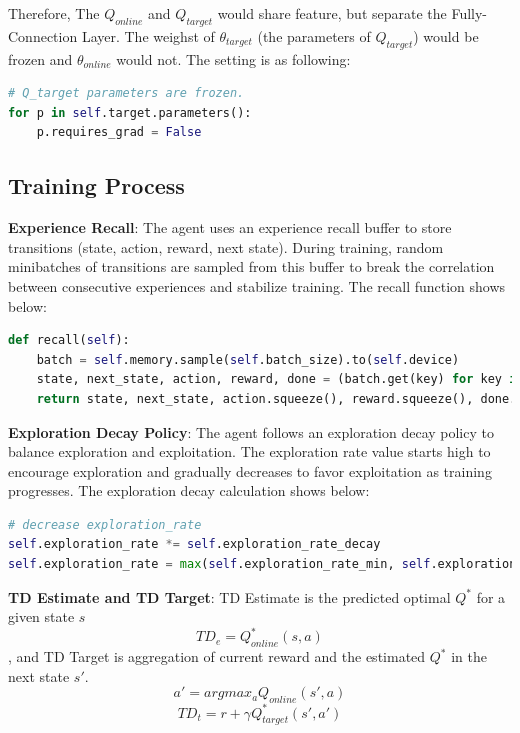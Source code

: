 \documentclass[preprint,12pt,3p,times]{elsarticle}
\begin{document}
Therefore, The \(Q_{online}\) and \(Q_{target}\) would share feature, but separate the Fully-Connection Layer. The weighst of \(\theta_{target}\) (the parameters of \(Q_{target}\)) would be frozen and \(\theta_{online}\) would not. The setting is as following:

\begin{lstlisting}[language=Python]
# Q_target parameters are frozen.
for p in self.target.parameters():
    p.requires_grad = False
\end{lstlisting}

\subsection{Training Process}
\textbf{Experience Recall}: The agent uses an experience recall buffer to store transitions (state, action, reward, next state). During training, random minibatches of transitions are sampled from this buffer to break the correlation between consecutive experiences and stabilize training. The recall function shows below:

\begin{lstlisting}[language=Python]
def recall(self):
    batch = self.memory.sample(self.batch_size).to(self.device)
    state, next_state, action, reward, done = (batch.get(key) for key in ("state", "next_state", "action", "reward", "done"))
    return state, next_state, action.squeeze(), reward.squeeze(), done.squeeze()
\end{lstlisting}

\textbf{Exploration Decay Policy}: The agent follows an exploration decay policy to balance exploration and exploitation. The exploration rate value starts high to encourage exploration and gradually decreases to favor exploitation as training progresses. The exploration decay calculation shows below:

\begin{lstlisting}[language=Python]
# decrease exploration_rate
self.exploration_rate *= self.exploration_rate_decay
self.exploration_rate = max(self.exploration_rate_min, self.exploration_rate)
\end{lstlisting}

\textbf{TD Estimate and TD Target}: TD Estimate is the predicted optimal \(Q^{*}\) for a given state \(s\)
\begin{equation*}\label{eq_kernel}
    TD_{e}=Q^{*}_{online}(s,a)
\end{equation*}
, and TD Target is aggregation of current reward and the estimated \(Q^{*}\) in the next state \(s'\).
\begin{equation*}\label{eq_kernel}
    a'=argmax_{a}Q_{online}(s', a)
\end{equation*}
\begin{equation*}\label{eq_kernel}
    TD_{t}=r + \gamma Q^{*}_{target}(s',a')
\end{equation*}
\end{document}
